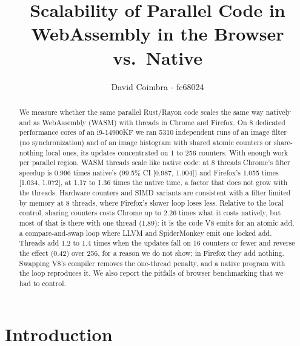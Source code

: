 \documentclass[sigplan]{acmart}
\begin{document}
\raggedbottom
\setlength{\emergencystretch}{2em}

\title{Scalability of Parallel Code in WebAssembly in the Browser vs.\ Native}

\author{David Coimbra - fc68024}

\begin{abstract}
We measure whether the same parallel Rust/Rayon code scales the same way
natively and as WebAssembly (WASM) with threads in Chrome and Firefox. On 8
dedicated performance cores of an i9-14900KF we ran 5310 independent runs of
an image filter (no synchronization) and of an image histogram with shared
atomic counters or share-nothing local ones, its updates concentrated on 1
to 256 counters. With enough work per parallel region, WASM threads scale
like native code: at 8 threads Chrome's filter speedup is 0.996 times
native's (99.5\% CI [0.987, 1.004]) and Firefox's 1.055 times [1.034,
1.072], at 1.17 to 1.36 times the native time, a factor that does not grow
with the threads. Hardware counters and SIMD variants are consistent with a
filter limited by memory at 8 threads, where Firefox's slower loop loses
less. Relative to the local control, sharing counters costs Chrome up to
2.26 times what it costs natively, but most of that is there with one
thread (1.89): it is the code V8 emits for an atomic add, a
compare-and-swap loop where LLVM and SpiderMonkey emit one locked add.
Threads add 1.2 to 1.4 times when the updates fall on 16 counters or fewer
and reverse the effect (0.42) over 256, for a reason we do not show; in
Firefox they add nothing. Swapping V8's compiler removes the one-thread
penalty, and a native program with the loop reproduces it. We also report
the pitfalls of browser benchmarking that we had to control.
\end{abstract}


\maketitle
\pagestyle{plain}

\section{Introduction}
\end{document}
